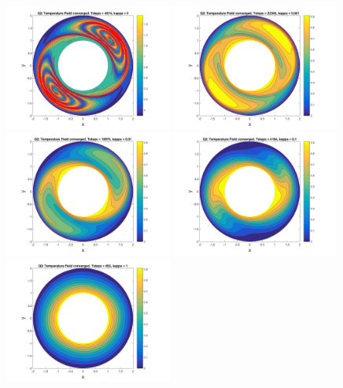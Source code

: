 \documentclass{article}
\begin{document}
	\begin{figure}[h!]
		\centering
		\includegraphics[width = 0.49\textwidth]{fig_q2Kappa0}
		\includegraphics[width = 0.49\textwidth]{fig_q2Kappa0001}
		\includegraphics[width = 0.49\textwidth]{fig_q2Kappa001}
		\includegraphics[width = 0.49\textwidth]{fig_q2Kappa01}
		\includegraphics[width = 0.49\textwidth]{fig_q2Kappa1}

\end{figure}
\end{document}
